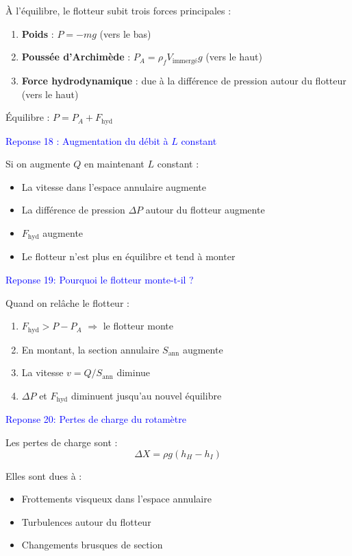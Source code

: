 	À l'équilibre, le flotteur subit trois forces principales :
	
	\begin{enumerate}
		\item \textbf{Poids} : $P =- m g$ (vers le bas)
		\item \textbf{Poussée d'Archimède} : $P_A = \rho_f V_{\text{immergé}} g$ (vers le haut)
		\item \textbf{Force hydrodynamique} : due à la différence de pression autour du flotteur (vers le haut)
	\end{enumerate}
	
	Équilibre : $P = P_A + F_{\text{hyd}}$
	
	
	\textcolor{blue}{Reponse 18 :  Augmentation du débit à $L$ constant}
	
		Si on augmente $Q$ en maintenant $L$ constant :
		\begin{itemize}
			\item La vitesse dans l'espace annulaire augmente
			\item La différence de pression $\Delta P$ autour du flotteur augmente
			\item $F_{\text{hyd}}$ augmente
			\item Le flotteur n'est plus en équilibre et tend à monter
		\end{itemize}
	
	
	\textcolor{blue}{Reponse 19: Pourquoi le flotteur monte-t-il ? }
	
	
	Quand on relâche le flotteur :
	\begin{enumerate}
		\item $F_{\text{hyd}} > P - P_A$ $\Rightarrow$ le flotteur monte
		\item En montant, la section annulaire $S_{\text{ann}}$ augmente
		\item La vitesse $v = Q/S_{\text{ann}}$ diminue
		\item $\Delta P$ et $F_{\text{hyd}}$ diminuent jusqu'au nouvel équilibre
	\end{enumerate}
	
	
	\textcolor{blue}{Reponse 20:  Pertes de charge du rotamètre}
	
	Les pertes de charge sont :
	\begin{equation}
		\Delta X = \rho g (h_H - h_I)
	\end{equation}
	
	Elles sont dues à :
	\begin{itemize}
		\item Frottements visqueux dans l'espace annulaire
		\item Turbulences autour du flotteur
		\item Changements brusques de section
	\end{itemize}
	
